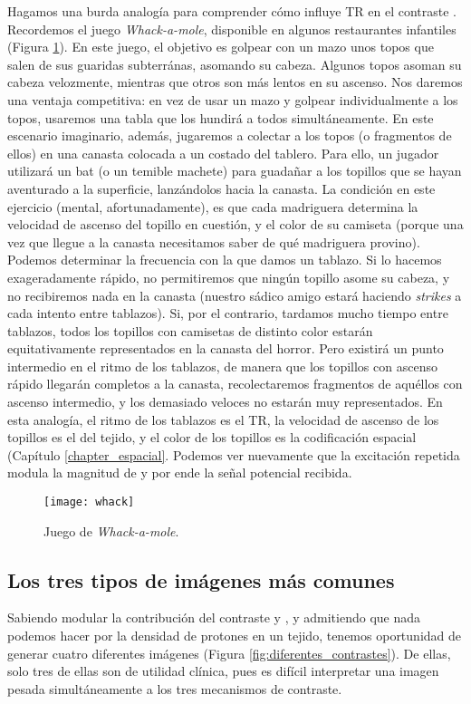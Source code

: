 Hagamos una burda analogía para comprender cómo influye TR en el contraste \Tone. Recordemos el juego \textit{Whack-a-mole}, disponible en algunos restaurantes infantiles (Figura \ref{fig:whack}). En este juego, el objetivo es golpear con un mazo unos topos que salen de sus guaridas subterránas, asomando su cabeza. Algunos topos asoman su cabeza velozmente, mientras que otros son más lentos en su ascenso. Nos daremos una ventaja competitiva: en vez de usar un mazo y golpear individualmente a los topos, usaremos una tabla que los hundirá a todos simultáneamente. En este escenario imaginario, además, jugaremos a colectar a los topos (o fragmentos de ellos) en una canasta colocada a un costado del tablero. Para ello, un jugador utilizará un bat (o un temible machete) para guadañar a los topillos que se hayan aventurado a la superficie, lanzándolos hacia la canasta. La condición en este ejercicio (mental, afortunadamente), es que cada madriguera determina la velocidad de ascenso del topillo en cuestión, y el color de su camiseta (porque una vez que llegue a la canasta necesitamos saber de qué madriguera provino). Podemos determinar la frecuencia con la que damos un tablazo. Si lo hacemos exageradamente rápido, no permitiremos que ningún topillo asome su cabeza, y no recibiremos nada en la canasta (nuestro sádico amigo estará haciendo \textit{strikes} a cada intento entre tablazos). Si, por el contrario, tardamos mucho tiempo entre tablazos, todos los topillos con camisetas de distinto color estarán equitativamente representados en la canasta del horror. Pero existirá un punto intermedio en el ritmo de los tablazos, de manera que los topillos con ascenso rápido llegarán completos a la canasta, recolectaremos fragmentos de aquéllos con ascenso intermedio, y los demasiado veloces no estarán muy representados. En esta analogía, el ritmo de los tablazos es el TR, la velocidad de ascenso de los topillos es el \Tone del tejido, y el color de los topillos es la codificación espacial (Capítulo \ref{chapter_espacial}. Podemos ver nuevamente que la excitación repetida modula la magnitud de \Mz y por ende la señal potencial recibida.


\begin{figure}[htb]
\begin{figg}
   \texttt{[image: whack]}
   \caption{Juego de \textit{Whack-a-mole}.}
 \label{fig:whack}
 \end{figg}
\end{figure}


\subsection{Los tres tipos de imágenes más comunes}
\label{sec:imagenescomunes}
Sabiendo modular la contribución del contraste \Tone y \Ttwo, y admitiendo que nada podemos hacer por la densidad de protones en un tejido, tenemos oportunidad de generar cuatro diferentes imágenes (Figura \ref{fig:diferentes_contrastes}). De ellas, solo tres de ellas son de utilidad clínica, pues es difícil interpretar una imagen pesada simultáneamente a los tres mecanismos de contraste.


